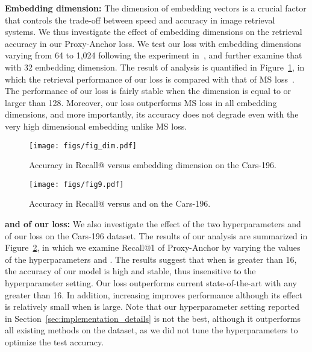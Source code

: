 \documentclass[10pt,twocolumn,letterpaper]{article}
\begin{document}
\vspace{1mm}
\noindent \textbf{Embedding dimension:}
The dimension of embedding vectors is a crucial factor that controls the trade-off between speed and accuracy in image retrieval systems.
We thus investigate the effect of embedding dimensions on the retrieval accuracy in our Proxy-Anchor loss.
We test our loss with embedding dimensions varying from 64 to 1,024 following the experiment in~\cite{wang2019multi}, and further examine that with 32 embedding dimension.
The result of analysis is quantified in Figure~\ref{fig:embedding_dim}, in which the retrieval performance of our loss is compared with that of MS loss~\cite{wang2019multi}.
The performance of our loss is fairly stable when the dimension is equal to or larger than 128.
Moreover, our loss outperforms MS loss in all embedding dimensions, and more importantly, its accuracy does not degrade even with the very high dimensional embedding unlike MS loss. 




\begin{figure} [!t]
\centering
\texttt{[image: figs/fig\_dim.pdf]}
\caption{Accuracy in Recall@ versus embedding dimension on the Cars-196.
} 
\label{fig:embedding_dim}
\end{figure}


\begin{figure} [!t]
\centering
\texttt{[image: figs/fig9.pdf]}
\caption{Accuracy in Recall@ versus  and  on the Cars-196.
} 
\label{fig:hyper_params}
\end{figure}



\vspace{1mm}
\noindent \textbf{ and  of our loss:} 
We also investigate the effect of the two hyperparameters  and  of our loss on the Cars-196 dataset.
The results of our analysis are summarized in Figure~\ref{fig:hyper_params}, in which we examine Recall@1 of Proxy-Anchor by varying the values of the hyperparameters  and .
The results suggest that when  is greater than 16, the accuracy of our model is high and stable, thus insensitive to the hyperparameter setting.
Our loss outperforms current state-of-the-art with any  greater than 16.
In addition, increasing  improves performance although its effect is relatively small when  is large.
Note that our hyperparameter setting reported in Section~\ref{sec:implementation_details} is not the best, although it outperforms all existing methods on the dataset, as we did not tune the hyperparameters to optimize the test accuracy.
\end{document}
